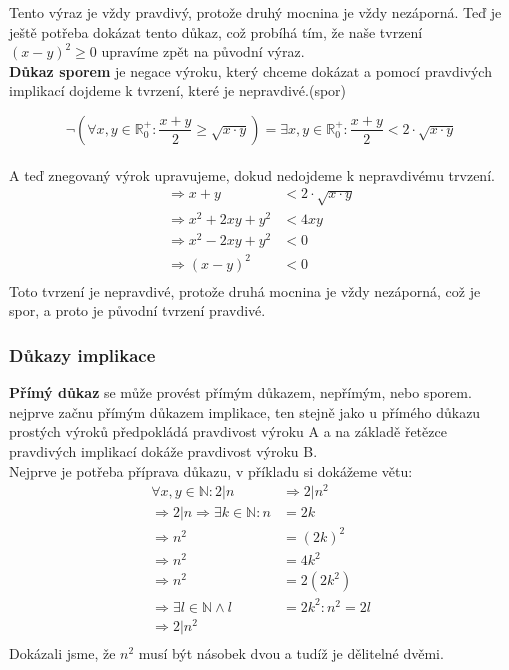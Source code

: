 \documentclass[12pt]{article}
\begin{document}
Tento výraz je vždy pravdivý, protože druhý mocnina je vždy nezáporná. Teď je ještě potřeba dokázat tento důkaz, což probíhá tím, že naše tvrzení $(x-y)^2 \geq 0$ upravíme zpět na původní výraz.\\

\textbf{Důkaz sporem} je negace výroku, který chceme dokázat a pomocí pravdivých implikací dojdeme k tvrzení, které je nepravdivé.(spor)

\[\neg(\forall x,y \in \mathbb{R}_0^+ : \frac{x+y}{2}\geq \sqrt{x\cdot y}) = \exists x,y \in \mathbb{R}_0^+ : \frac{x+y}{2}<2\cdot \sqrt{x\cdot y}\]\\
A teď znegovaný výrok upravujeme, dokud nedojdeme k nepravdivému trvzení.
\begin{align*}
\Rightarrow x+y &< 2\cdot \sqrt{x\cdot y}\\
\Rightarrow x^2 + 2xy + y^2 &< 4xy\\
\Rightarrow x^2 - 2xy + y^2 &< 0\\
\Rightarrow (x-y)^2 &< 0\\
\end{align*}
Toto tvrzení je nepravdivé, protože druhá mocnina je vždy nezáporná, což je spor, a proto je původní tvrzení pravdivé.
\subsubsection*{Důkazy implikace}
\textbf{Přímý důkaz} se může provést přímým důkazem, nepřímým, nebo sporem.
nejprve začnu přímým důkazem implikace, ten stejně jako u přímého důkazu prostých výroků předpokládá pravdivost výroku A a na základě řetězce pravdivých implikací dokáže pravdivost výroku B.\\
Nejprve je potřeba příprava důkazu, v příkladu si dokážeme větu:
\begin{align*}
\forall x,y \in \mathbb{N}: 2|n &\Rightarrow 2|n^2\\
\Rightarrow 2|n \Rightarrow \exists k \in \mathbb{N}: n &= 2k\\
\Rightarrow n^2 &= (2k)^2\\
\Rightarrow n^2 &= 4k^2\\
\Rightarrow n^2 &= 2(2k^2)\\
\Rightarrow \exists l \in \mathbb{N} \land l &= 2k^2: n^2 = 2l\\
\Rightarrow 2|n^2\\
\end{align*}
Dokázali jsme, že $n^2$ musí být násobek dvou a tudíž je dělitelné dvěmi.
\end{document}
